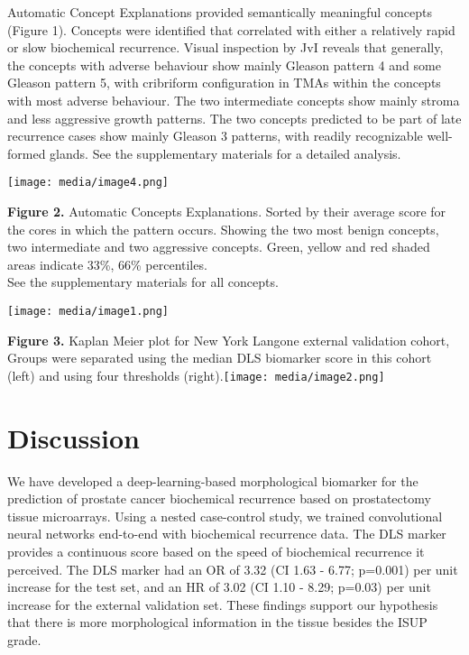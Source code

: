 \documentclass[
  12pt,
  a5,margin=2cmpaper,
]{article}
\begin{document}
Automatic Concept Explanations provided semantically meaningful concepts
(Figure 1). Concepts were identified that correlated with either a
relatively rapid or slow biochemical recurrence. Visual inspection by
JvI reveals that generally, the concepts with adverse behaviour show
mainly Gleason pattern 4 and some Gleason pattern 5, with cribriform
configuration in TMAs within the concepts with most adverse behaviour.
The two intermediate concepts show mainly stroma and less aggressive
growth patterns. The two concepts predicted to be part of late
recurrence cases show mainly Gleason 3 patterns, with readily
recognizable well-formed glands. See the supplementary materials for a
detailed analysis.

\texttt{[image: media/image4.png]}

\textbf{Figure 2.} Automatic Concepts Explanations. Sorted by their
average score for the cores in which the pattern occurs. Showing the two
most benign concepts, two intermediate and two aggressive concepts.
Green, yellow and red shaded areas indicate 33\%, 66\% percentiles.\\
See the supplementary materials for all concepts.

\texttt{[image: media/image1.png]}

\textbf{Figure 3.} Kaplan Meier plot for New York Langone external
validation cohort, Groups were separated using the median DLS biomarker
score in this cohort (left) and using four thresholds
(right).\texttt{[image: media/image2.png]}

\hypertarget{section}{%
\section{}\label{section}}

\hypertarget{discussion}{%
\section{Discussion}\label{discussion}}

We have developed a deep-learning-based morphological biomarker for the
prediction of prostate cancer biochemical recurrence based on
prostatectomy tissue microarrays. Using a nested case-control study, we
trained convolutional neural networks end-to-end with biochemical
recurrence data. The DLS marker provides a continuous score based on the
speed of biochemical recurrence it perceived. The DLS marker had an OR
of 3.32 (CI 1.63 - 6.77; p=0.001) per unit increase for the test set,
and an HR of 3.02 (CI 1.10 - 8.29; p=0.03) per unit increase for the
external validation set. These findings support our hypothesis that
there is more morphological information in the tissue besides the ISUP
grade.
\end{document}
